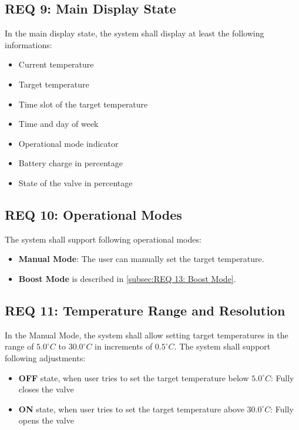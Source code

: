 \subsection*{REQ 9: Main Display State}
\label{subsec:REQ 9: Main Display State}
In the main display state, the system shall display at least the following informations:
\begin{itemize}
    \item Current temperature
    \item Target temperature
    \item Time slot of the target temperature
    \item Time and day of week
    \item Operational mode indicator
    \item Battery charge in percentage
    \item State of the valve in percentage
\end{itemize}

\subsection*{REQ 10: Operational Modes}
\label{subsec:REQ 10: Operational Modes}
The system shall support following operational modes:
\begin{itemize}
    \item \textbf{Manual Mode}: The user can manually set the target temperature.
    \item \textbf{Boost Mode} is described in \ref{subsec:REQ 13: Boost Mode}.
\end{itemize}

\subsection*{REQ 11: Temperature Range and Resolution}
\label{subsec:REQ 11: Temperature Range and Resolution}
In the Manual Mode, the system shall allow setting target temperatures in the range of $5.0^\circ C$ to $30.0^\circ C$ in increments of $0.5^\circ C$. The system shall support following adjustments:
\begin{itemize}
    \item \textbf{OFF} state, when user tries to set the target temperature below $5.0^\circ C$: Fully closes the valve%
    \item \textbf{ON} state, when user tries to set the target temperature above $30.0^\circ C$: Fully opens the valve%
\end{itemize}


